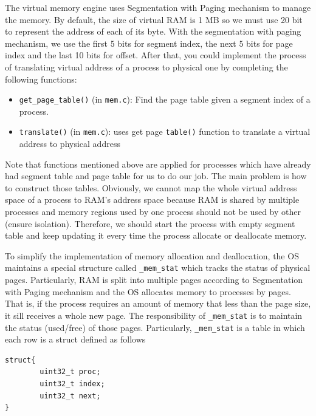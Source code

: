 \documentclass[a4paper]{article}
\numberwithin{equation}{section}
\begin{document}
The virtual memory engine uses Segmentation with Paging mechanism to manage the memory. By default, the size of virtual RAM is 1 MB so we must use 20 bit to represent the address of each of its byte. With the segmentation with paging mechanism, we use the first 5 bits for segment index, the next 5 bits for page index and the last 10 bits for offset. After that, you could implement the process of translating virtual address of a process to physical one by completing the following functions:
\begin{itemize}
    \item \texttt{get_page_table()} (in \texttt{mem.c}): Find the page table given a segment index of a process.
    \item \texttt{translate()} (in \texttt{mem.c}): uses get page \texttt{table()} function to translate a virtual address to physical address
\end{itemize}

Note that functions mentioned above are applied for processes which have already had segment table and page table for us to do our job. The main problem is how to construct those tables. Obviously, we cannot map the whole virtual address space of a process to RAM’s address space because RAM is shared by multiple processes and memory regions used by one process should not be used by other (ensure isolation). Therefore, we should start the process with empty segment table and keep updating it every time the process allocate or deallocate memory.

To simplify the implementation of memory allocation and deallocation, the OS maintains a special structure called \texttt{_mem_stat} which tracks the status of physical pages. Particularly, RAM is split into multiple pages according to Segmentation with Paging mechanism and the OS allocates memory to processes by pages. That is, if the process requires an amount of memory that less than the page size, it sill receives a whole new page. The responsibility of \texttt{_mem_stat} is to maintain the status (used/free) of those pages. Particularly, \texttt{_mem_stat} is a table in which each row is a struct defined as follows

\begin{mdframed}[leftline=true,rightline=true,backgroundcolor=white!10,nobreak=true]
  \begin{verbatim}
struct{
        uint32_t proc;
        uint32_t index;
        uint32_t next;
}
  \end{verbatim}
\end{mdframed}
\end{document}

